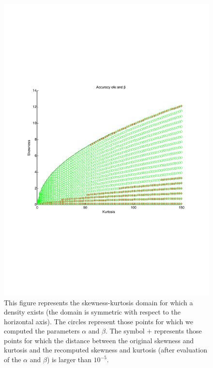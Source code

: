 \documentclass[a4paper, 12pt, oneside]{Thesis}
\begin{document}
\begin{figure}[htbp]
\begin{center}
\includegraphics[trim= 1.5cm 7.5cm 1.cm 7.5cm,clip,scale=0.8
]{GautschiPrecisionHigh.pdf}
\caption{This figure represents the skewness-kurtosis domain for which a density exists (the domain is symmetric with respect to the horizontal axis). The circles represent those points for which we computed the parameters $\alpha$ and $\beta$. The symbol $+$ represents those points for which the distance between the original skewness and kurtosis and the recomputed skewness and kurtosis (after evaluation of the $\alpha$ and $\beta$) is larger than $10^{-5}$.}
\label{Fig_Domain}
\end{center}
\end{figure}
\end{document}
